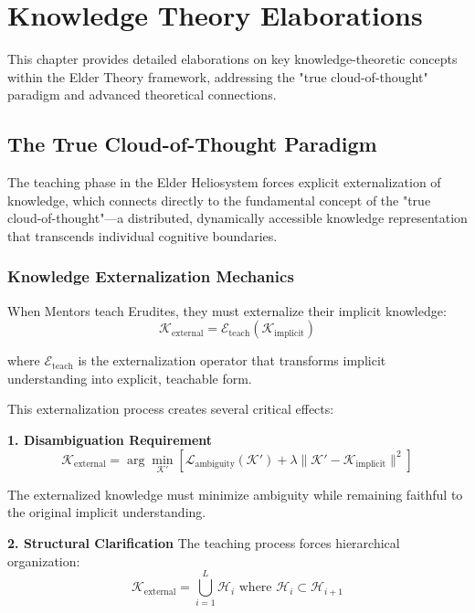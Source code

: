 \chapter{Knowledge Theory Elaborations}

This chapter provides detailed elaborations on key knowledge-theoretic concepts within the Elder Theory framework, addressing the "true cloud-of-thought" paradigm and advanced theoretical connections.

\section{The True Cloud-of-Thought Paradigm}

The teaching phase in the Elder Heliosystem forces explicit externalization of knowledge, which connects directly to the fundamental concept of the "true cloud-of-thought"—a distributed, dynamically accessible knowledge representation that transcends individual cognitive boundaries.

\subsection{Knowledge Externalization Mechanics}

When Mentors teach Erudites, they must externalize their implicit knowledge:
\begin{equation}
\mathcal{K}_{\text{external}} = \mathcal{E}_{\text{teach}}(\mathcal{K}_{\text{implicit}})
\end{equation}

where $\mathcal{E}_{\text{teach}}$ is the externalization operator that transforms implicit understanding into explicit, teachable form.

This externalization process creates several critical effects:

\textbf{1. Disambiguation Requirement}
\begin{equation}
\mathcal{K}_{\text{external}} = \arg\min_{\mathcal{K}'} \left[ \mathcal{L}_{\text{ambiguity}}(\mathcal{K}') + \lambda \|\mathcal{K}' - \mathcal{K}_{\text{implicit}}\|^2 \right]
\end{equation}

The externalized knowledge must minimize ambiguity while remaining faithful to the original implicit understanding.

\textbf{2. Structural Clarification}
The teaching process forces hierarchical organization:
\begin{equation}
\mathcal{K}_{\text{external}} = \bigcup_{i=1}^{L} \mathcal{H}_i \text{ where } \mathcal{H}_i \subset \mathcal{H}_{i+1}
\end{equation}


